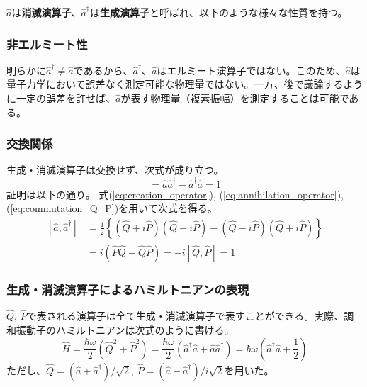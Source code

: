 $\hat a$は\textbf{消滅演算子}、$\hat a^\dagger$は\textbf{生成演算子}と呼ばれ、以下のような様々な性質を持つ。
\subsubsection{非エルミート性}
明らかに$\hat a^\dagger \neq \hat a$であるから、$\hat a^\dagger$、$\hat a$はエルミート演算子ではない。このため、$\hat a$は量子力学において誤差なく測定可能な物理量ではない。一方、後で議論するように一定の誤差を許せば、$\hat a$が表す物理量（複素振幅）を測定することは可能である。

\subsubsection{交換関係}
生成・消滅演算子は交換せず、次式が成り立つ。
\begin{equation}
  [\hat a, \hat a^\dagger] = \hat a \hat a^\dagger - \hat a^\dagger \hat a = 1
\end{equation}
証明は以下の通り。
式(\ref{eq:creation_operator}), (\ref{eq:annihilation_operator}), (\ref{eq:commutation_Q_P})を用いて次式を得る。
\begin{equation}
\begin{aligned}
  \left[\hat a , \hat a^\dagger\right] &= \frac{1}{2}\left\{(\hat Q + i\hat P)(\hat Q - i\hat P) - (\hat Q - i\hat P)(\hat Q + i\hat P)\right\} \\
  &= i(\hat P\hat Q - \hat Q\hat P) = -i[\hat Q, \hat P] = 1
\end{aligned}
\end{equation}

\subsubsection{生成・消滅演算子によるハミルトニアンの表現}
$\hat Q$, $\hat P$で表される演算子は全て生成・消滅演算子で表すことができる。実際、調和振動子のハミルトニアンは次式のように書ける。
\begin{equation}
  \hat H = \frac{\hbar \omega}{2}(\hat Q^2 + \hat P^2) = \frac{\hbar \omega}{2}(\hat a^\dagger \hat a + \hat a \hat a^\dagger) = \hbar \omega\left(\hat a^\dagger \hat a + \frac 1 2\right)
\end{equation}
ただし、$\hat Q = (\hat a + \hat a^\dagger)/\sqrt 2$, $\hat P = (\hat a - \hat a^\dagger) / i\sqrt 2$を用いた。

